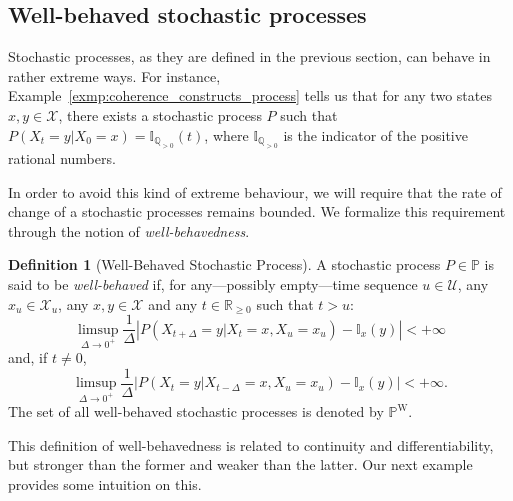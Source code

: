 \documentclass[10pt,a4paper]{paper}
\theoremstyle{definition}
\newtheorem{definition}{Definition}
\newcommand{\reals}{\mathbb{R}}
\newcommand{\states}{\mathcal{X}}
\newcommand{\processes}{\mathbb{P}}
\newcommand{\wprocesses}{\processes^{\mathrm{W}}}
\newcommand{\ind}[1]{\mathbb{I}_{#1}}
\newcommand{\abs}[1]{\left\vert #1 \right\vert}
\begin{document}
\subsection{Well-behaved stochastic processes}\label{sec:well_behaved}

Stochastic processes, as they are defined in the previous section, can behave in rather extreme ways. For instance, Example~\ref{exmp:coherence_constructs_process} tells us that for any two states $x,y\in\mathcal{X}$, there exists a stochastic process $P$ such that $P(X_t=y\vert X_0=x)=\ind{\mathbb{Q}_{>0}}(t)$, where $\ind{\mathbb{Q}_{>0}}$ is the indicator of the positive rational numbers.

In order to avoid this kind of extreme behaviour, we will require that the rate of change of a stochastic processes remains bounded. We formalize this requirement through the notion of \emph{well-behavedness}. 


\begin{definition}[Well-Behaved Stochastic Process]
\label{def:well-behaved}
A stochastic process $P\in\processes$ is said to be \emph{well-behaved} if, for any---possibly empty---time sequence $u\in\mathcal{U}$, any $x_u\in\states_u$, any $x,y\in\states$ and any $t\in\reals_{\geq0}$ such that $t>u$:
\begin{equation}\label{eq:def:well-behaved:right}
\limsup_{\Delta\to 0^{+}}\frac{1}{\Delta}\abs{P(X_{t+\Delta}=y\vert X_t=x, X_u=x_u)-\ind{x}(y)}<+\infty
\end{equation}
and, if $t\neq0$,
\begin{equation}\label{eq:def:well-behaved:left}
\limsup_{\Delta\to 0^{+}}\frac{1}{\Delta}\abs{P(X_{t}=y\vert X_{t-\Delta}=x, X_u=x_u)-\ind{x}(y)}<+\infty.
\end{equation}
The set of all well-behaved stochastic processes is denoted by $\wprocesses$.
\end{definition}

This definition of well-behavedness is related to continuity and differentiability, but stronger than the former and weaker than the latter. Our next example provides some intuition on this.
\end{document}
